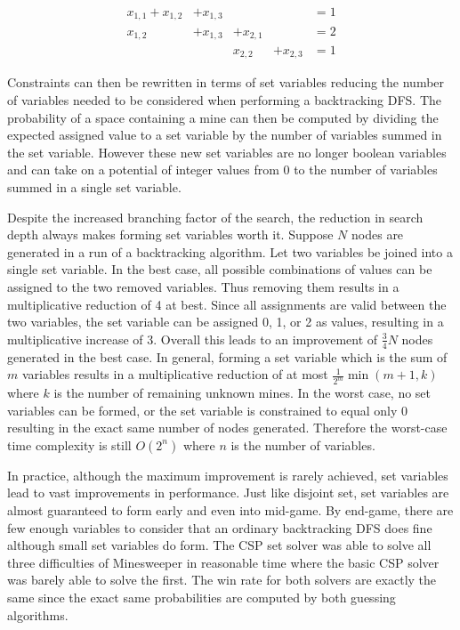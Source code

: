 \documentclass[letterpaper]{article}
\begin{document}
\begin{equation}\label{eq:set_variables}
\begin{aligned}
x_{1,1} + x_{1,2} &+ x_{1,3}&&&= 1\\
x_{1,2} &+ x_{1,3} &+ x_{2,1}&&= 2\\
&&x_{2,2} &+ x_{2,3} &= 1
\end{aligned}
\end{equation}

Constraints can then be rewritten in terms of set variables reducing the number of variables needed to be considered when performing a backtracking DFS.  The probability of a space containing a mine can then be computed by dividing the expected assigned value to a set variable by the number of variables summed in the set variable.  However these new set variables are no longer boolean variables and can take on a potential of integer values from 0 to the number of variables summed in a single set variable.  

Despite the increased branching factor of the search, the reduction in search depth always makes forming set variables worth it.  Suppose $N$ nodes are generated in a run of a backtracking algorithm.  Let two variables be joined into a single set variable.  In the best case, all possible combinations of values can be assigned to the two removed variables.  Thus removing them results in a multiplicative reduction of 4 at best.  Since all assignments are valid between the two variables, the set variable can be assigned 0, 1, or 2 as values, resulting in a multiplicative increase of 3.  Overall this leads to an improvement of $\frac34 N$ nodes generated in the best case.  In general, forming a set variable which is the sum of $m$ variables results in a multiplicative reduction of at most $\frac{1}{2^m}\min(m+1,k)$ where $k$ is the number of remaining unknown mines.  In the worst case, no set variables can be formed, or the set variable is constrained to equal only 0 resulting in the exact same number of nodes generated.  Therefore the worst-case time complexity is still $O(2^n)$ where $n$ is the number of variables.

In practice, although the maximum improvement is rarely achieved, set variables lead to vast improvements in performance.  Just like disjoint set, set variables are almost guaranteed to form early and even into mid-game.  By end-game, there are few enough variables to consider that an ordinary backtracking DFS does fine although small set variables do form.  The CSP set solver was able to solve all three difficulties of Minesweeper in reasonable time where the basic CSP solver was barely able to solve the first.  The win rate for both solvers are exactly the same since the exact same probabilities are computed by both guessing algorithms.
\end{document}
